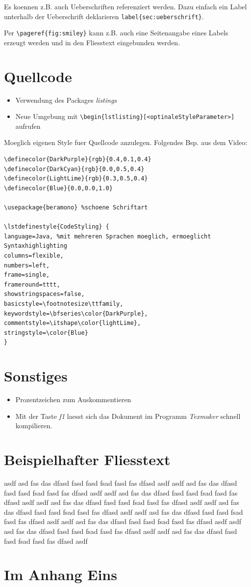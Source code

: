 \documentclass[11pt]{report}
\begin{document}
Es koennen z.B. auch Ueberschriften referenziert werden. Dazu einfach ein Label unterhalb der Ueberschrift deklarieren \verb|label{sec:ueberschrift}|. 

Per \verb|\pageref{fig:smiley}| kann z.B. auch eine Seitenangabe eines Labels erzeugt werden und in den Fliesstext eingebunden werden. 


\section{Quellcode}
\begin{itemize}
	\item Verwendung des Packages \emph{listings}
	\item Neue Umgebung mit \verb|\begin{lstlisting}[<optinaleStyleParameter>]| aufrufen
\end{itemize}
Moeglich eigenen Style fuer Quellcode anzulegen. Folgendes Bsp. aus dem Video:
\begin{verbatim}
\definecolor{DarkPurple}{rgb}{0.4,0.1,0.4}
\definecolor{DarkCyan}{rgb}{0.0,0.5,0.4}
\definecolor{LightLime}{rgb}{0.3,0.5,0.4}
\definecolor{Blue}{0.0,0.0,1.0}

\usepackage{beramono} %schoene Schriftart

\lstdefinestyle{CodeStyling} {
language=Java, %mit mehreren Sprachen moeglich, ermoeglicht Syntaxhighlighting
columns=flexible,
numbers=left,
frame=single,
frameround=tttt,
showstringspaces=false,
basicstyle=\footnotesize\ttfamily,
keywordstyle=\bfseries\color{DarkPurple},
commentstyle=\itshape\color{lightLime},
stringstyle=\color{Blue}
}
\end{verbatim}




\section{Sonstiges}
\begin{itemize}[leftmargin=*]
  \item Prozentzeichen zum Auskommentieren 
  \item Mit der Taste \emph{f1} laesst sich das Dokument im Programm \emph{Texmaker} schnell kompilieren.
\end{itemize}

\section{Beispielhafter Fliesstext}
asdf asd fas das dfasd fasd fasd fsad fasd fas dfasd asdf asdf asd fas das dfasd fasd fasd fsad fasd fas dfasd asdf asdf asd fas das dfasd fasd fasd fsad fasd fas dfasd asdf asdf asd fas das dfasd fasd fasd fsad fasd fas dfasd asdf asdf asd fas das dfasd fasd fasd fsad fasd fas dfasd asdf asdf asd fas das dfasd fasd fasd fsad fasd fas dfasd asdf asdf asd fas das dfasd fasd fasd fsad fasd fas dfasd asdf asdf asd fas das dfasd fasd fasd fsad fasd fas dfasd asdf asdf asd fas das dfasd fasd fasd fsad fasd fas dfasd asdf 


\clearpage
\appendix
{}
\thispagestyle{plain}
\section{Im Anhang Eins}
\end{document}
